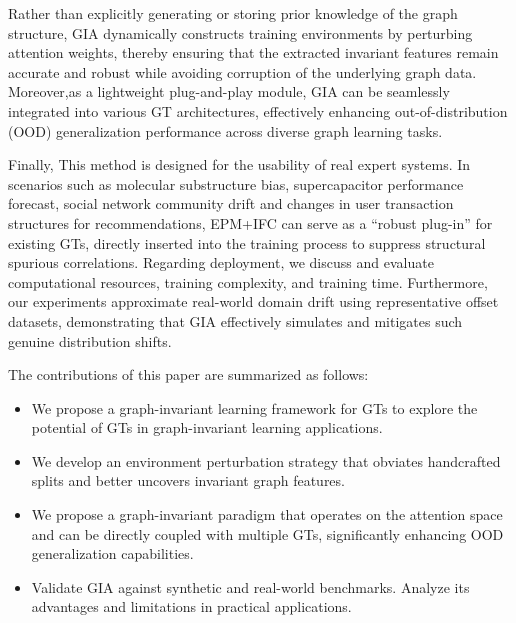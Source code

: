 \documentclass[a4paper,fleqn]{cas-dc}
\begin{document}
Rather than explicitly generating or storing prior knowledge of the graph structure, GIA dynamically constructs training environments by perturbing attention weights, thereby ensuring that the extracted invariant features remain accurate and robust while avoiding corruption of the underlying graph data. Moreover,as a lightweight plug-and-play module, GIA can be seamlessly integrated into various GT architectures, effectively enhancing out-of-distribution (OOD) generalization performance across diverse graph learning tasks. 

Finally, This method is designed for the usability of real expert systems. In scenarios such as molecular substructure bias\cite{zang2023hierarchical},  {\color{blue}supercapacitor performance forecast\cite{EMADELDEEN2024113556}}, social network community drift and changes in user transaction structures for recommendations, {\color{blue}EPM+IFC can serve as a “robust plug-in” for existing GTs, directly inserted into the training process to suppress structural spurious correlations. Regarding deployment, we discuss and evaluate computational resources, training complexity, and training time. Furthermore, our experiments approximate real-world domain drift using representative offset datasets, demonstrating that GIA effectively simulates and mitigates such genuine distribution shifts.}

The contributions of this paper are summarized as follows:
\begin{itemize}
    \item  %
    {\color{blue}We propose a graph-invariant learning framework for GTs to explore the potential of GTs in graph-invariant learning applications.}
    \item  We develop an environment perturbation strategy that obviates handcrafted splits and better uncovers invariant graph features.
    \item %
    We propose a graph-invariant paradigm that operates on the attention space and can be directly coupled with multiple GTs, significantly enhancing OOD generalization capabilities.
    \item %
    {\color{blue}Validate GIA against synthetic and real-world benchmarks. Analyze its advantages and limitations in practical applications.}
\end{itemize} 
\end{document}
